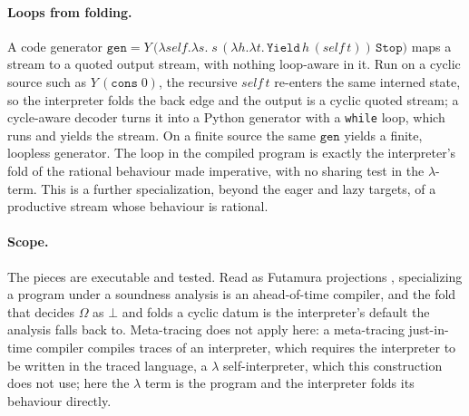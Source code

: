 \paragraph{Loops from folding.}
A code generator
$\mathtt{gen} = Y\,\big(\lambda\mathit{self}.\lambda s.\;
s\,(\lambda h.\lambda t.\,\mathtt{Yield}\,h\,(\mathit{self}\,t))\,\mathtt{Stop}\big)$
maps a stream to a quoted output stream, with nothing loop-aware in it. Run on a cyclic source such
as $Y\,(\mathtt{cons}\;0)$, the recursive $\mathit{self}\,t$ re-enters the same interned state, so
the interpreter folds the back edge and the output is a cyclic quoted stream; a cycle-aware decoder
turns it into a Python generator with a \texttt{while} loop, which runs and yields the stream. On a
finite source the same $\mathtt{gen}$ yields a finite, loopless generator. The loop in the compiled
program is exactly the interpreter's fold of the rational behaviour made imperative, with no sharing
test in the $\lambda$-term. This is a further specialization, beyond the eager and lazy targets, of a
productive stream whose behaviour is rational.

\paragraph{Scope.}
The pieces are executable and tested. Read as Futamura projections ,
specializing a program under a soundness analysis is an ahead-of-time compiler, and the fold that
decides $\Omega$ as $\bot$ and folds a cyclic datum is the interpreter's default the analysis falls
back to. Meta-tracing does not apply here: a meta-tracing just-in-time compiler
 compiles traces of an interpreter, which requires the interpreter to be
written in the traced language, a $\lambda$ self-interpreter, which this construction does not use;
here the $\lambda$ term is the program and the interpreter folds its behaviour directly.

